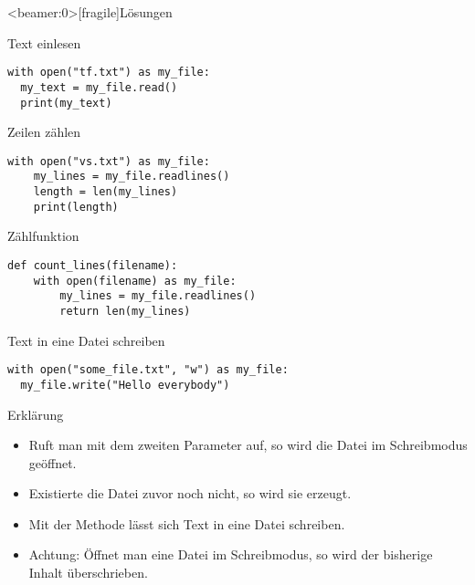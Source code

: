 \begin{frame}<beamer:0>[fragile]{Lösungen}
\begin{solutionblock}{Text einlesen}
\begin{verbatim}
with open("tf.txt") as my_file:
  my_text = my_file.read()
  print(my_text)
\end{verbatim}
\end{solutionblock}
\begin{solutionblock}{Zeilen zählen}
\begin{verbatim}
with open("vs.txt") as my_file:
    my_lines = my_file.readlines()
    length = len(my_lines)
    print(length)
\end{verbatim}
\end{solutionblock}
\begin{solutionblock}{Zählfunktion}
\begin{verbatim}
def count_lines(filename): 
    with open(filename) as my_file:
        my_lines = my_file.readlines()
        return len(my_lines)
\end{verbatim}
\end{solutionblock}
\end{frame}




\begin{fragile}
\begin{block}{Text in eine Datei schreiben}
\pause 
\vspace{2pt}

\begin{verbatim}
with open("some_file.txt", "w") as my_file:
  my_file.write("Hello everybody")
\end{verbatim}

\pause
\vspace{12pt}

\begin{exampleblock}{Erklärung}
\vspace{2pt}
\begin{itemize}[<+->]
\item Ruft man  mit dem zweiten Parameter  auf, so wird die Datei im Schreibmodus geöffnet. 
\item Existierte die Datei zuvor noch nicht, so wird sie erzeugt. 
\item Mit der Methode  lässt sich Text in eine Datei schreiben. 
\item Achtung: Öffnet man eine Datei im Schreibmodus, so wird der bisherige Inhalt überschrieben. 
\end{itemize}
\end{exampleblock}
\end{block}
\end{fragile}

